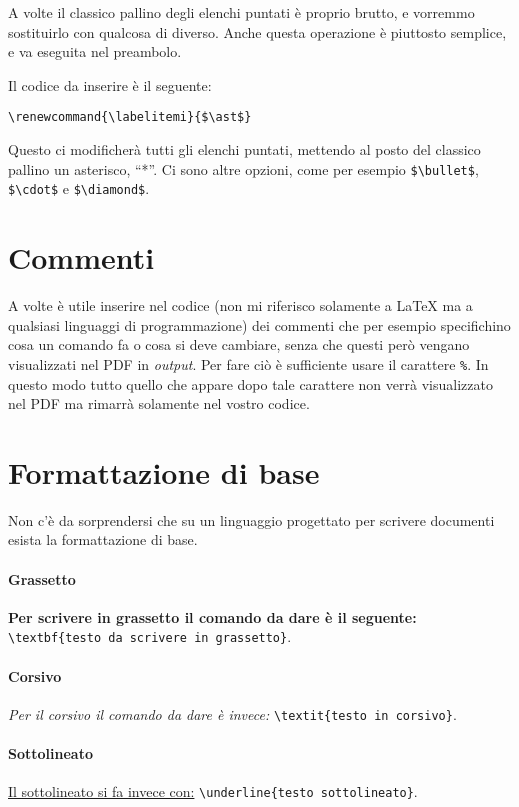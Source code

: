 A volte il classico pallino degli elenchi puntati è proprio brutto, e vorremmo
sostituirlo con qualcosa di diverso.
Anche questa operazione è piuttosto semplice, e va eseguita nel preambolo.

\noindent Il codice da inserire è il seguente:

\verb!\renewcommand{\labelitemi}{$\ast$}!

\noindent Questo ci modificherà tutti gli elenchi puntati, mettendo al posto
del classico pallino un asterisco, ``*''. Ci sono altre opzioni, come per
esempio \verb!$\bullet$!, \verb!$\cdot$! e \verb!$\diamond$!.

\section{Commenti}
A volte è utile inserire nel codice (non mi riferisco solamente a \LaTeX{} ma 
a qualsiasi linguaggi di programmazione) dei commenti che per esempio 
specifichino cosa un comando fa o cosa si deve cambiare, senza che questi però 
vengano visualizzati nel PDF in \textit{output}. Per fare ciò è sufficiente 
usare il carattere \texttt{\%}. In questo modo tutto quello che appare dopo 
tale carattere non verrà visualizzato nel PDF ma rimarrà solamente nel vostro 
codice.

\section{Formattazione di base}

Non c'è da sorprendersi che su un linguaggio progettato per scrivere documenti
esista la formattazione di base.

\paragraph*{Grassetto} \textbf{Per scrivere in grassetto il comando da dare è
il seguente: }\verb!\textbf{testo da scrivere in grassetto}!.

\paragraph*{Corsivo} \textit{Per il corsivo il comando da dare è invece: }
\verb!\textit{testo in corsivo}!.

\paragraph*{Sottolineato} \underline{Il sottolineato si fa invece con:}
\verb!\underline{testo sottolineato}!.

